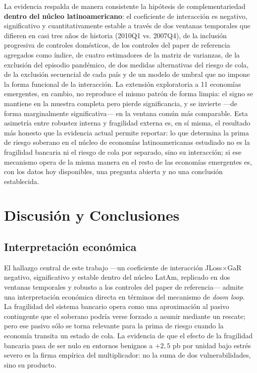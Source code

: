 \documentclass[5p,times,twocolumn,authoryear]{elsarticle}
\begin{document}
La evidencia respalda de manera consistente la hipótesis de complementariedad \textbf{dentro del núcleo latinoamericano}: el coeficiente de interacción es negativo, significativo y cuantitativamente estable a través de dos ventanas temporales que difieren en casi tres años de historia (2010Q1 vs. 2007Q4), de la inclusión progresiva de controles domésticos, de los controles del paper de referencia agregados como índice, de cuatro estimadores de la matriz de varianzas, de la exclusión del episodio pandémico, de dos medidas alternativas del riesgo de cola, de la exclusión secuencial de cada país y de un modelo de umbral que no impone la forma funcional de la interacción. La extensión exploratoria a 11 economías emergentes, en cambio, no reproduce el mismo patrón de forma limpia: el signo se mantiene en la muestra completa pero pierde significancia, y se invierte —de forma marginalmente significativa— en la ventana común más comparable. Esta asimetría entre robustez interna y fragilidad externa es, en sí misma, el resultado más honesto que la evidencia actual permite reportar: lo que determina la prima de riesgo soberano en el núcleo de economías latinoamericanas estudiado no es la fragilidad bancaria ni el riesgo de cola por separado, sino su interacción; si ese mecanismo opera de la misma manera en el resto de las economías emergentes es, con los datos hoy disponibles, una pregunta abierta y no una conclusión establecida.


\section{Discusión y Conclusiones}

\subsection{Interpretación económica}

El hallazgo central de este trabajo —un coeficiente de interacción JLoss$\times$GaR negativo, significativo y estable dentro del núcleo LatAm, replicado en dos ventanas temporales y robusto a los controles del paper de referencia— admite una interpretación económica directa en términos del mecanismo de \textit{doom loop}. La fragilidad del sistema bancario opera como una aproximación al pasivo contingente que el soberano podría verse forzado a asumir mediante un rescate; pero ese pasivo sólo se torna relevante para la prima de riesgo cuando la economía transita un estado de cola. La evidencia de que el efecto de la fragilidad bancaria pasa de ser nulo en entornos benignos a $+2{,}5$ pb por unidad bajo estrés severo es la firma empírica del multiplicador: no la suma de dos vulnerabilidades, sino su producto.
\end{document}
